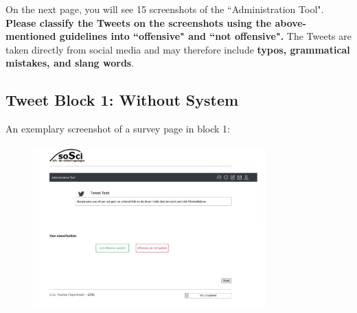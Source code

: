 On the next page, you will see 15 screenshots of the ``Administration Tool".\newline
\textbf{Please classify the Tweets on the screenshots using the above-mentioned guidelines into ``offensive" and ``not offensive".}\newline
The Tweets are taken directly from social media and may therefore include \textbf{typos, grammatical mistakes, and slang words}.\newline



\subsection{Tweet Block 1: Without System}
An exemplary screenshot of a survey page in block 1:
\begin{figure} [H]
	\centering
	\includegraphics[width=0.8\textwidth]{img/app_screenshot_no_sys.JPG}
	\label{fig:app_block1}
\end{figure}



